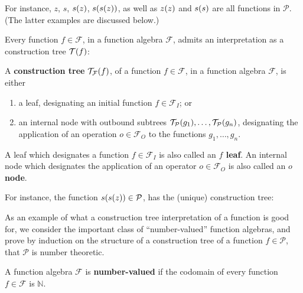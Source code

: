 For instance, $z$, $s$, $s{\mathopen{}\left({z}\right)\mathclose{}}$, $s{\mathopen{}\left({s{\mathopen{}\left({z}\right)\mathclose{}}}\right)\mathclose{}}$, as well as $z{\mathopen{}\left({z}\right)\mathclose{}}$ and
$s{\mathopen{}\left({s}\right)\mathclose{}}$ are all functions in $\mathcal{P}$. (The latter examples are
discussed below.)

Every function $f \in \mathcal{F}$, in a function algebra $\mathcal{F}$, admits
an interpretation as a construction tree $\mathcal{T}{\mathopen{}\left({f}\right)\mathclose{}}$:

\begin{definition} \label{def:construction-tree} A \textbf{construction tree}
$\mathcal{T}_\mathcal{F}{\mathopen{}\left({f}\right)\mathclose{}}$, of a function $f \in \mathcal{F}$, in a
function algebra $\mathcal{F}$, is either

\begin{enumerate}[label=(\arabic*)]

\item a leaf, designating an initial function $f \in \mathcal{F}_I$; or

\item an internal node with outbound subtrees
$\mathcal{T}_\mathcal{P}{\mathopen{}\left({g_1}\right)\mathclose{}},\ldots,\mathcal{T}_\mathcal{P}{\mathopen{}\left({g_n}\right)\mathclose{}}$,
designating the application of an operation $o \in \mathcal{F}_O$ to the
functions $g_1,\ldots,g_n$.

\end{enumerate}

\end{definition}

A leaf which designates a function $f \in \mathcal{F}_I$ is also called an
\textbf{$f$ leaf}. An internal node which designates the application of an
operator $o \in \mathcal{F}_O$ is also called an \textbf{$o$ node}.

For instance, the function $s{\mathopen{}\left({s{\mathopen{}\left({z}\right)\mathclose{}}}\right)\mathclose{}} \in \mathcal{P}$, has the (unique)
construction tree:

\begin{center}
\end{center}

As an example of what a construction tree interpretation of a function is good
for, we consider the important class of ``number-valued'' function algebras,
and prove by induction on the structure of a construction tree of a function $f
\in \mathcal{P}$, that $\mathcal{P}$ is number theoretic.

\begin{definition} A function algebra $\mathcal{F}$ is \textbf{number-valued}
if the codomain of every function $f \in \mathcal{F}$ is $\mathbb{N}$.
\end{definition}

